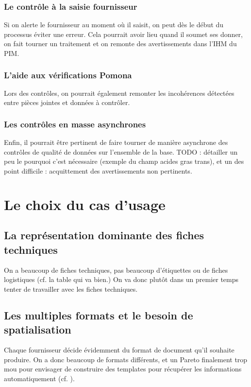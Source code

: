             \subsection{Le contrôle à la saisie fournisseur}
            Si on alerte le fournisseur au moment où il saisit, on peut dès le début du processus éviter une erreur.
            Cela pourrait avoir lieu quand il soumet ses donner, on fait tourner un traitement et on remonte des avertissements dans l'IHM du PIM.

            \subsection{L'aide aux vérifications Pomona}
            Lors des contrôles, on pourrait également remonter les incohérences détectées entre pièces jointes et données à contrôler.

            \subsection{Les contrôles en masse asynchrones}
            Enfin, il pourrait être pertinent de faire tourner de manière asynchrone des contrôles de qualité de données sur l'ensemble de la base.
            TODO : détailler un peu le pourquoi c'est nécessaire (exemple du champ acides gras trans), et un des point difficile : acquittement des avertissements non pertinents.

    \chapter{Le choix du cas d'usage}

        \section{La représentation dominante des fiches techniques}
        On a beaucoup de fiches techniques, pas beaucoup d'étiquettes ou de fiches logistiques (cf. la table qui va bien.)
        On va donc plutôt dans un premier temps tenter de travailler avec les fiches techniques.

        \section{Les multiples formats et le besoin de \og spatialisation \fg}
        \label{formats_spatialisation}

        Chaque fournisseur décide évidemment du format de document qu'il souhaite produire.
        On a donc beaucoup de formats différents, et un Pareto finalement trop \og mou \fg pour envisager de construire des templates pour récupérer les informations automatiquement (cf. ).
    
